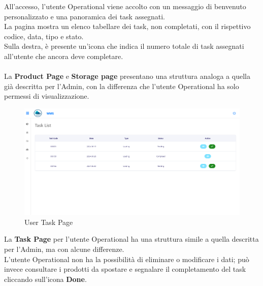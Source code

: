 All'accesso, l'utente Operational viene accolto con un messaggio di benvenuto personalizzato e una panoramica dei task assegnati.\\
La pagina mostra un elenco tabellare dei task, non completati, con il rispettivo codice, data, tipo e stato.\\
Sulla destra, è presente un'icona che indica il numero totale di task assegnati all'utente che ancora deve completare.
\\\\
La \textbf{Product Page} e \textbf{Storage page} presentano una struttura analoga a quella già descritta per l'Admin,
con la differenza che l'utente Operational ha solo permessi di visualizzazione.
\\
\begin{figure}[H]
    \centering
    \includegraphics[width=\textwidth]{document/sections/img/Storyboard/userTaskPage.png}
    \caption{User Task Page}
    \label{fig:userTaskPage}
\end{figure}
La \textbf{Task Page} per l'utente Operational ha una struttura simile a quella descritta per l'Admin, ma con alcune
differenze.\\ L'utente Operational non ha la possibilità di eliminare o modificare i dati; può invece consultare i
prodotti da spostare e segnalare il completamento del task cliccando sull'icona \textbf{Done}.